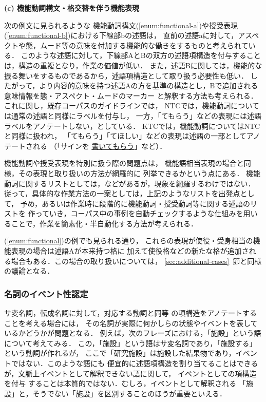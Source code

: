 \documentclass[japanese]{jnlp_1.4}
\begin{document}
\noindent
{\bf (c) 機能動詞構文・格交替を伴う機能表現}

次の例文に見られるような
機能動詞構文(\ref{enum:functional-a})や授受表現(\ref{enum:functional-b})における下線部bの述語は，
直前の述語aに対して，アスペクトや態，ムード等の意味を付加する機能的な働きをするものと考えられている\cite{matsumoto1996syntactic,村木新次郎1991日本語動詞の諸相}．
このような述語に対して，下線部AとBの双方の述語項構造を付与することは，構造の重複となり，作業の価値が低い．
また，述語Bに関しては，機能的な振る舞いをするものであるから，述語項構造として取り扱う必要性も低い．
したがって，より内容的意味を持つ述語Aの方を基準の構造とし，Bで追加される意味情報を態・アスペクト・ムードのマーカー
と解釈する方法も考えられる．
これに関し，既存コーパスのガイドラインでは，
NTCでは，機能動詞については通常の述語と同様にラベルを付与し，
一方，「てもらう」などの表現には述語ラベルをアノテートしない，としている．
KTCでは，機能動詞についてはNTCと同様に扱われ，
「てもらう」「てほしい」などの表現は述語の一部としてアノテートされる
（「サインを \underline{書いてもらう}」など）．

機能動詞や授受表現を特別に扱う際の問題点は，
機能語相当表現の場合と同様，その表現と取り扱いの方法が網羅的に
列挙できるかという点にある．
機能動詞に関するリストとしては，\cite{izumi2009}などがあるが，現象を網羅するわけではない．
従って，具体的な作業方法の一案としては，上記のようなリストを出発点として，
予め，あるいは作業時に段階的に機能動詞・授受動詞等に関する述語のリストを
作っていき，コーパス中の事例を自動チェックするような仕組みを用いることで，作業を簡素化・半自動化する方法が考えられる．

(\ref{enum:functional})の例でも見られる通り，
これらの表現が使役・受身相当の機能表現の場合は述語Aが本来持つ格に
加えて使役格などの新たな格が追加される場合もある．この場合の取り扱いについては，
\ref{sec:additional-cases}~節と同様の議論となる．


\subsubsection{名詞のイベント性認定}
\label{sec:event-noun-dicision}

サ変名詞，転成名詞に対して，対応する動詞と同等
の項構造をアノテートすることを考える場合には，
その名詞が実際に何かしらの状態やイベントを表しているかどうかが問題となる．
例えば，次のフレーズにおける，「施設」という語について考えてみる．
この，「施設」という語はサ変名詞であり，「施設する」という動詞が作れるが，
ここで「研究施設」は施設した結果物であり，イベントではない．このような語にも
便宜的に述語項構造を割り当てることはできるが，文脈上イベントとして解釈できない語に関して，
イベントとしての項構造を付与
することは本質的ではない．むしろ，イベントとして解釈される
「施設」と，そうでない「施設」を区別することのほうが重要といえる．
\end{document}
